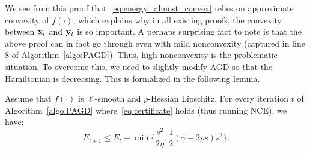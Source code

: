 We see from this proof that~\eqref{eq:energy_almost_convex} relies on approximate convexity of $f(\cdot)$, which explains why in all existing proofs, the convexity between $\mathbf{x}_t$ and $\mathbf{y}_t$ is so important. A perhaps surprising fact to note is that the above proof can in fact go through even with mild nonconvexity (captured in line $8$ of Algorithm~\ref{algo:PAGD}).
Thus, high nonconvexity is the problematic situation.
To overcome this, we need to slightly modify AGD so that the Hamiltonian is
decreasing. This is formalized in the following lemma.


\begingroup
\def\thetheorem{\ref{lem:energy_NCE}}
\begin{lemma}
Assume that $f(\cdot)$ is $\ell$-smooth and $\rho$-Hessian Lipschitz. For every iteration $t$ of Algorithm~\ref{algo:PAGD} where~\eqref{eq:certificate} holds (thus running NCE), we have:
\begin{equation*}
E_{t+1}\le E_t -\min\{\frac{s^2}{2\eta},  \frac{1}{2}(\gamma - 2\rho s) s^2\}.
\end{equation*}
\end{lemma}
\addtocounter{theorem}{-1}
\endgroup


